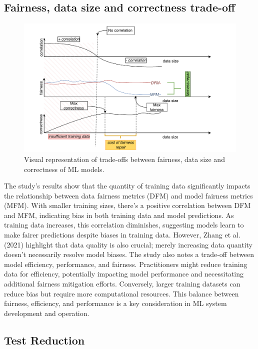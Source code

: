 \documentclass[sigconf,review]{acmart}
\begin{document}
\subsection{Fairness, data size and correctness trade-off}\label{sec:discuss-fair-eff-perf-trade}

\begin{figure}
  \centering
  \includegraphics[width=\linewidth]{tradeoff.pdf}
  \caption{Visual representation of trade-offs between fairness, data
    size and correctness of ML models.}
  \label{fig:tradeoff}
\end{figure}

The study's results show that the quantity of training data
significantly impacts the relationship between data fairness metrics
(DFM) and model fairness metrics (MFM). With smaller training sizes,
there's a positive correlation between DFM and MFM, indicating bias in
both training data and model predictions. As training data increases,
this correlation diminishes, suggesting models learn to make fairer
predictions despite biases in training data. However, Zhang et al.
(2021) highlight that data quality is also crucial; merely increasing
data quantity doesn't necessarily resolve model biases. The study also
notes a trade-off between model efficiency, performance, and fairness.
Practitioners might reduce training data for efficiency, potentially
impacting model performance and necessitating additional fairness
mitigation efforts. Conversely, larger training datasets can reduce
bias but require more computational resources. This balance between
fairness, efficiency, and performance is a key consideration in ML
system development and operation.
\subsection{Test Reduction}\label{sec:discuss-test-red}
\end{document}
